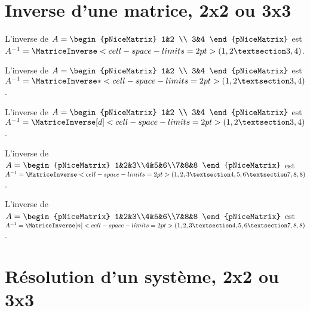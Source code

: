 \documentclass[french,a4paper,10pt]{article}
\begin{document}
\section{Inverse d'une matrice, 2x2 ou 3x3}

\begin{ShowCodeTeX}
L'inverse de $A=\begin{pNiceMatrix} 1&2 \\ 3&4 \end{pNiceMatrix}$ est
$A^{-1}=\MatriceInverse<cell-space-limits=2pt>(1,2 § 3,4)$.
\end{ShowCodeTeX}

\begin{ShowCodeTeX}
L'inverse de $A=\begin{pNiceMatrix} 1&2 \\ 3&4 \end{pNiceMatrix}$ est
$A^{-1}=\MatriceInverse*<cell-space-limits=2pt>(1,2 § 3,4)$.
\end{ShowCodeTeX}

\begin{ShowCodeTeX}
L'inverse de $A=\begin{pNiceMatrix} 1&2 \\ 3&4 \end{pNiceMatrix}$ est
$A^{-1}=\MatriceInverse[d]<cell-space-limits=2pt>(1,2 § 3,4)$.
\end{ShowCodeTeX}

\begin{ShowCodeTeX}
L'inverse de $A=\begin{pNiceMatrix} 1&2&3\\4&5&6\\7&8&8 \end{pNiceMatrix}$ est
$A^{-1}=\MatriceInverse<cell-space-limits=2pt>(1,2,3 § 4,5,6 § 7,8,8)$.
\end{ShowCodeTeX}

\begin{ShowCodeTeX}
L'inverse de $A=\begin{pNiceMatrix} 1&2&3\\4&5&6\\7&8&8 \end{pNiceMatrix}$ est
$A^{-1}=\MatriceInverse[n]<cell-space-limits=2pt>(1,2,3 § 4,5,6 § 7,8,8)$.
\end{ShowCodeTeX}

\section*{Résolution d'un système, 2x2 ou 3x3}
\end{document}
